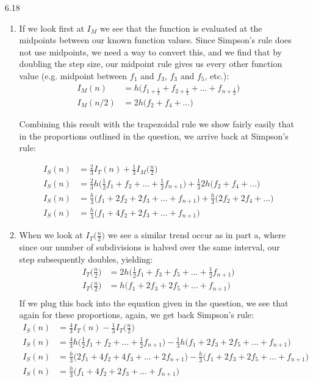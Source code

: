 \documentclass[11pt,a4paper]{article}
\begin{document}
\begin{itemize}
			\item[6.18]
				\begin{enumerate} [label={\alph*)}]
					\item If we look first at $I_M$ we see that the function is evaluated at the midpoints between our known function values. Since Simpson's rule does not use midpoints, we need a way to convert this, and we find that by doubling the step size, our midpoint rule gives us every other function value (e.g. midpoint between $f_1$ and $f_3$, $f_3$ and $f_5$, etc.):
					\begin{align*}
						I_M(n) &= h\Big(f_{1+\frac{1}{2}} + f_{2+\frac{1}{2}}+\dots+f_{n+\frac{1}{2}}\Big) \\
						I_M(n/2) &= 2h\Big(f_2 + f_4+\dots\Big)
					\end{align*}
					
					Combining this result with the trapezoidal rule we show fairly easily that in the proportions outlined in the question, we arrive back at Simpson's rule:
					
					\begin{align*}
						I_S(n) &= \frac{2}{3}I_T(n) + \frac{1}{3}I_M\Big(\frac{n}{2}\Big) \\
						I_S(n) &= \frac{2}{3}h\Big(\frac{1}{2}f_{1} + f_{2}+\dots+\frac{1}{2}f_{n+1}\Big) + \frac{1}{3}2h\Big(f_2 + f_4+\dots\Big) \\
						I_S(n) &= \frac{h}{3}\Big(f_{1} + 2f_{2}+2f_3+\dots+f_{n+1}\Big) + \frac{h}{3}\Big(2f_2 + 2f_4+\dots\Big) \\
						I_S(n) &= \frac{h}{3}\Big(f_{1} + 4f_{2}+2f_3+\dots+f_{n+1}\Big)
					\end{align*}
					\item When we look at $I_T\Big(\frac{n}{2}\Big)$ we see a similar trend occur as in part a, where since our number of subdivisions is halved over the same interval, our step subsequently doubles, yielding:
					\begin{align*}
						I_T\Big(\frac{n}{2}\Big) &= 2h\Big(\frac{1}{2}f_1 + f_3 + f_5 + \dots+\frac{1}{2}f_{n+1}\Big) \\
						I_T\Big(\frac{n}{2}\Big) &= h\Big(f_1 + 2f_3 + 2f_5 + \dots+f_{n+1}\Big) \\
					\end{align*}
					If we plug this back into the equation given in the question, we see that again for these proportions, again, we get back Simpson's rule:
					\begin{align*}
						I_S(n) &= \frac{4}{3}I_T(n) - \frac{1}{3}I_T\Big(\frac{n}{2}\Big) \\
						I_S(n) &= \frac{4}{3}h\Big(\frac{1}{2}f_{1} + f_{2}+\dots+\frac{1}{2}f_{n+1}\Big) - \frac{1}{3}h\Big(f_1 + 2f_3 + 2f_5 + \dots+f_{n+1}\Big) \\
						I_S(n) &= \frac{h}{3}\Big(2f_{1} + 4f_{2}+4f_3+\dots+2f_{n+1}\Big) - \frac{h}{3}\Big(f_1 + 2f_3 + 2f_5 + \dots+f_{n+1}\Big) \\
						I_S(n) &= \frac{h}{3}\Big(f_{1} + 4f_{2}+2f_3+\dots+f_{n+1}\Big)
					\end{align*}
				\end{enumerate}
				

\end{itemize}
\end{document}
